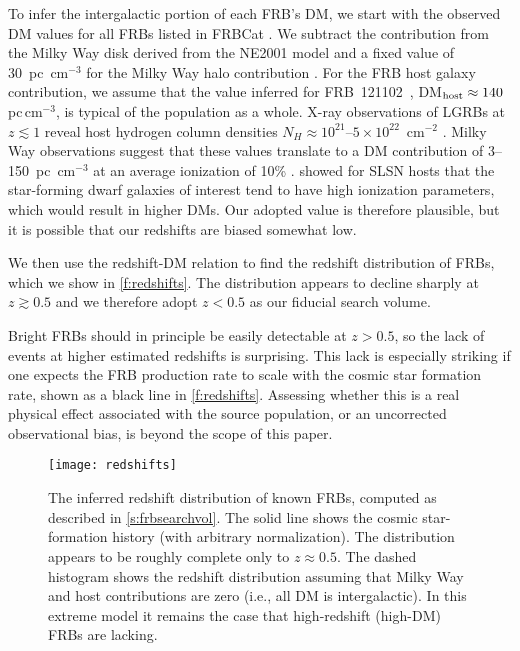 \documentclass[twocolumn]{aastex6}
\newcommand{\repeater}{FRB~121102}
\begin{document}
To infer the intergalactic portion of each FRB's DM, we start with the observed DM values for all FRBs listed in FRBCat \citep{pet2016}. We subtract the contribution from the Milky Way disk derived from the NE2001 model \citep{cl.2002} and a fixed value of 30~pc~cm$^{-3}$ for the Milky Way halo contribution \citep{dgbb.2015}. For the FRB host galaxy contribution, we assume that the value inferred for \repeater\ \citep{tbc+.2017}, DM$_{\rm host}\approx 140$\,pc\,cm$^{-3}$, is typical of the population as a whole. X-ray observations of LGRBs at $z \lesssim 1$ reveal host hydrogen column densities $N_H \approx 10^{21}$--$5 \times 10^{22}$~cm$^{-2}$ \citep{swt+.2013}. Milky Way observations suggest that these values translate to a DM contribution of 3--150~pc~cm$^{-3}$ at an average ionization of 10\% \citep{hnk.2013}. \citet{lel2015} showed for SLSN hosts that the star-forming dwarf galaxies of interest tend to have high ionization parameters, which would result in higher DMs. Our adopted value is therefore plausible, but it is possible that our redshifts are biased somewhat low.

We then use the redshift-DM relation to find the redshift distribution of FRBs, which we show in \autoref{f:redshifts}. The distribution appears to decline sharply at $z\gtrsim 0.5$ and we therefore adopt $z<0.5$ as our fiducial search volume.

Bright FRBs should in principle be easily detectable at $z>0.5$, so the lack of events at higher estimated redshifts is surprising. This lack is especially striking if one expects the FRB production rate to scale with the cosmic star formation rate, shown as a black line in \autoref{f:redshifts}. Assessing whether this is a real physical effect associated with the source population, or an uncorrected observational bias, is beyond the scope of this paper.

\begin{figure}
\texttt{[image: redshifts]}
\caption{The inferred redshift distribution of known FRBs, computed as described in \autoref{s:frbsearchvol}. The solid line shows the cosmic star-formation history (with arbitrary normalization). The distribution appears to be roughly complete only to $z\approx 0.5$. The dashed histogram shows the redshift distribution assuming that Milky Way and host contributions are zero (i.e., all DM is intergalactic). In this extreme model it remains the case that high-redshift (high-DM) FRBs are lacking.}
\label{f:redshifts}
\end{figure}
\end{document}
